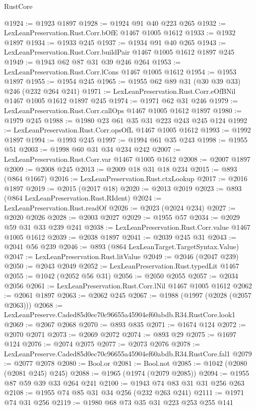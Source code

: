 \begin{lexlean}{RustCore}
\begin{coremodule}
@1924 := @1923 @1897
@1928 := @1924 @91 @40 @223 @265
@1932 := LexLeanPreservation.Rust.Corr.bOfE @1467 @1005 @1612
@1933 := @1932 @1897
@1934 := @1933 @245
@1937 := @1934 @91 @40 @265
@1943 := LexLeanPreservation.Rust.Corr.buildPair @1467 @1005 @1612 @1897 @245
@1949 := @1943 @62 @87 @31 @39 @246 @264
@1953 := LexLeanPreservation.Rust.Corr.lCons @1467 @1005 @1612
@1954 := @1953 @1897
@1955 := @1954 @245
@1965 := @1955 @62 @89 @31 (@30 @39 @33) @246 (@232 @264 @241)
@1971 := LexLeanPreservation.Rust.Corr.eOfBNil @1467 @1005 @1612 @1897 @245
@1974 := @1971 @62 @31 @246
@1979 := LexLeanPreservation.Rust.Corr.callOps @1467 @1005 @1612 @1897
@1980 := @1979 @245
@1988 := @1980 @23 @61 @35 @31 @223 @243 @245 @124
@1992 := LexLeanPreservation.Rust.Corr.opsOfL @1467 @1005 @1612
@1993 := @1992 @1897
@1994 := @1993 @245
@1997 := @1994 @61 @35 @243
@1998 := @1955 @51
@2003 := @1998 @60 @31 @34 @234 @242
@2007 := LexLeanPreservation.Rust.Corr.var @1467 @1005 @1612
@2008 := @2007 @1897
@2009 := @2008 @245
@2013 := @2009 @18 @31 @18 @234
@2015 := @893 (@864 @1667)
@2016 := LexLeanPreservation.Rust.ctxLookup
@2017 := @2016 @1897
@2019 := @2015 (@2017 @18)
@2020 := @2013 @2019
@2023 := @893 (@864 LexLeanPreservation.Rust.RIdent)
@2024 := LexLeanPreservation.Rust.readOf
@2026 := @2023 (@2024 @234)
@2027 := @2020 @2026
@2028 := @2003 @2027
@2029 := @1955 @57
@2034 := @2029 @59 @31 @33 @239 @241
@2038 := LexLeanPreservation.Rust.Corr.value @1467 @1005 @1612
@2039 := @2038 @1897
@2041 := @2039 @245 @31
@2043 := @2041 @56 @239
@2046 := @893 (@864 LexLeanTarget.TargetSyntax.Value)
@2047 := LexLeanPreservation.Rust.litValue
@2049 := @2046 (@2047 @239)
@2050 := @2043 @2049
@2052 := LexLeanPreservation.Rust.typedLit @1467
@2055 := @1042 (@2052 @56 @31)
@2056 := @2050 @2055
@2057 := @2034 @2056
@2061 := LexLeanPreservation.Rust.Corr.lNil @1467 @1005 @1612
@2062 := @2061 @1897
@2063 := @2062 @245
@2067 := @1988 (@1997 (@2028 (@2057 @2063)))
@2068 := LexLeanPreserve.Caded85d0ec70c96655a45904ef60abdb.R34.RustCore.look1
@2069 := @2067 @2068
@2070 := @893 @835
@2071 := @1674 @124
@2072 := @2070 @2071
@2073 := @2069 @2072
@2074 := @893 @29
@2075 := @1697 @124
@2076 := @2074 @2075
@2077 := @2073 @2076
@2078 := LexLeanPreserve.Caded85d0ec70c96655a45904ef60abdb.R34.RustCore.fal1
@2079 := @2077 @2078
@2080 := Bool.or
@2081 := Bool.not
@2085 := @1042 (@2080 (@2081 @245) @245)
@2088 := @1965 (@1974 (@2079 @2085))
@2094 := @1955 @87 @59 @39 @33 @264 @241
@2100 := @1943 @74 @83 @31 @31 @256 @263
@2108 := @1955 @74 @85 @31 @34 @256 (@232 @263 @241)
@2111 := @1971 @74 @31 @256
@2119 := @1980 @68 @73 @35 @31 @223 @253 @255 @141

\end{coremodule}
\end{lexlean}
